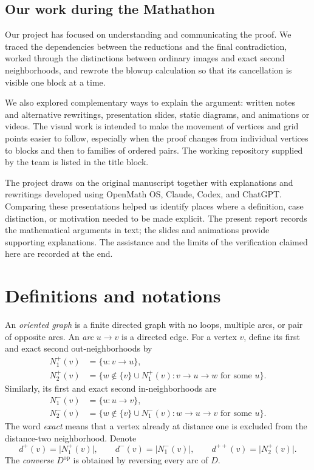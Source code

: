 \documentclass[11pt]{article}
\newcommand{\abs}[1]{\lvert#1\rvert}
\begin{document}
\subsection{Our work during the Mathathon}
Our project has focused on understanding and communicating the proof.
We traced the dependencies between the reductions and the final
contradiction, worked through the distinctions between ordinary images
and exact second neighborhoods, and rewrote the blowup calculation so
that its cancellation is visible one block at a time.

We also explored complementary ways to explain the argument: written
notes and alternative rewritings, presentation slides, static diagrams,
and animations or videos. The visual work is intended to make the
movement of vertices and grid points easier to follow, especially when
the proof changes from individual vertices to blocks and then to
families of ordered pairs. The working repository supplied by the team
is listed in the title block.

The project draws on the original manuscript together with explanations
and rewritings developed using OpenMath OS, Claude, Codex, and ChatGPT.
Comparing these presentations helped us identify places where a
definition, case distinction, or motivation needed to be made explicit.
The present report records the mathematical arguments in text; the
slides and animations provide supporting explanations. The assistance
and the limits of the verification claimed here are recorded at the end.

\section{Definitions and notations}
\label{sec:definitions}

An \emph{oriented graph} is a finite directed graph with no loops,
multiple arcs, or pair of opposite arcs. An \emph{arc} $u\to v$ is a
directed edge. 
For a vertex $v$, define its first and exact second out-neighborhoods by
\begin{align*}
 N_1^+(v)&=\{u:v\to u\},\\
 N_2^+(v)&=\{w\notin\{v\}\cup N_1^+(v):
                        v\to u\to w\text{ for some }u\}.
\end{align*}
Similarly, its first and exact second in-neighborhoods are
\begin{align*}
 N_1^-(v)&=\{u:u\to v\},\\
 N_2^-(v)&=\{w\notin\{v\}\cup N_1^-(v):
                        w\to u\to v\text{ for some }u\}.
\end{align*}
The word \emph{exact} means that a vertex already at distance one is
excluded from the distance-two neighborhood. Denote
\[
 d^+(v)=\abs{N_1^+(v)},\qquad d^-(v)=\abs{N_1^-(v)},\qquad
 d^{++}(v)=\abs{N_2^+(v)}.
\]
The \emph{converse} $D^{\mathrm{op}}$ is obtained by reversing every
arc of $D$.
\end{document}
